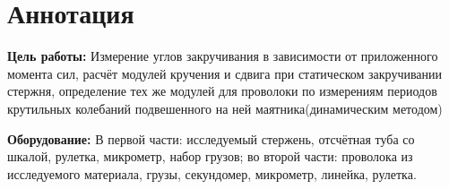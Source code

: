 \section{Аннотация}
\textbf{Цель работы:} Измерение углов закручивания в зависимости от
приложенного момента сил, расчёт модулей кручения и сдвига при статическом
закручивании стержня, определение тех же модулей для проволоки по измерениям
периодов крутильных колебаний подвешенного на ней маятника(динамическим методом)

\textbf{Оборудование:} В первой части: исследуемый стержень, отсчётная
туба со шкалой, рулетка, микрометр, набор грузов; во второй части: проволока
из исследуемого материала, грузы, секундомер, микрометр, линейка, рулетка.
